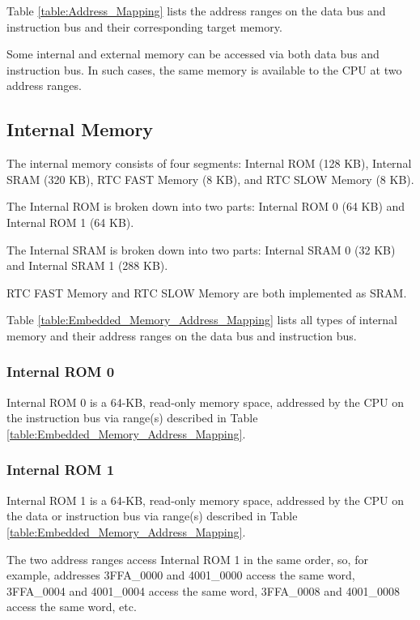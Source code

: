 \documentclass[main\_\_EN.tex]{subfiles}
\begin{document}
Table \ref{table:Address_Mapping} lists the address ranges on the data bus and instruction bus and their corresponding target memory.

Some internal and external memory can be accessed via both data bus and instruction bus. In such cases, the same memory is available to the CPU at two address ranges.





\subsection{Internal Memory}\label{para:internal memory}

The internal memory consists of four segments: Internal ROM (128 KB), Internal SRAM (320 KB), RTC FAST Memory (8 KB), and RTC SLOW Memory (8 KB).

The Internal ROM is broken down into two parts: Internal ROM 0 (64 KB) and Internal ROM 1 (64 KB).

The Internal SRAM is broken down into two parts: Internal SRAM 0 (32 KB) and Internal SRAM 1 (288 KB).

RTC FAST Memory and RTC SLOW Memory are both implemented as SRAM.

Table \ref{table:Embedded_Memory_Address_Mapping} lists all types of internal memory and their address ranges on the data bus and instruction bus.





\subsubsection{Internal ROM 0}

Internal ROM 0 is a 64-KB, read-only memory space, addressed by the CPU on the instruction bus via range(s) described in Table \ref{table:Embedded_Memory_Address_Mapping}.


\subsubsection{Internal ROM 1}

Internal ROM 1 is a 64-KB, read-only memory space, addressed by the CPU on the data or instruction bus via range(s) described in Table \ref{table:Embedded_Memory_Address_Mapping}.

The two address ranges access Internal ROM 1 in the same order, so, for example, addresses \hexprefix{}3FFA\_0000 and \hexprefix{}4001\_0000 access the same word, \hexprefix{}3FFA\_0004 and \hexprefix{}4001\_0004 access the same word, \hexprefix{}3FFA\_0008 and \hexprefix{}4001\_0008 access the same word, etc.
\end{document}
